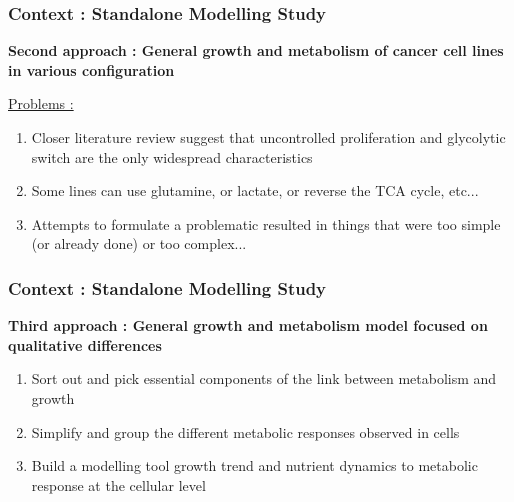 \documentclass{beamer}
\begin{document}
\begin{frame}
	\frametitle{Context : Standalone Modelling Study}
	
	\textbf{Second approach : General growth and metabolism of cancer cell lines in various configuration
	}
	
	\vspace{1cm}
	\underline{Problems :}
	\begin{enumerate}
		\item Closer literature review suggest that uncontrolled proliferation and glycolytic switch are the only widespread characteristics
		\item Some lines can use glutamine, or lactate, or reverse the TCA cycle, etc...
		\item Attempts to formulate a problematic resulted in things that were too simple (or already done) or too complex...  
	\end{enumerate}
	

\end{frame}

\begin{frame}
	\frametitle{Context : Standalone Modelling Study}
	
	\textbf{Third approach : General growth and metabolism model focused on qualitative differences
	}
	
	\vspace{1cm}

	\begin{enumerate}
		\item Sort out and pick essential components of the link between metabolism and growth
		\item Simplify and group the different metabolic responses observed in cells 
		\item Build a modelling tool growth trend and nutrient dynamics to metabolic response at the cellular level  
	\end{enumerate}
	

\end{frame}
\end{document}
